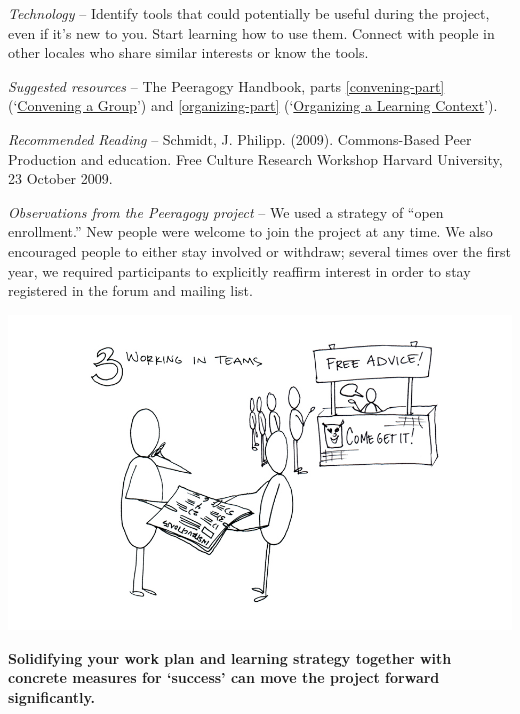 \medskip

\emph{Technology} -- Identify tools that could potentially be useful
during the project, even if it's new to you. Start learning how to use
them. Connect with people in other locales who share similar interests
or know the tools.

\medskip

\emph{Suggested resources} -- The Peeragogy Handbook, parts \ref{convening-part}
(`\href{http://peeragogy.org/convening-a-group/}{Convening a Group}')
and \ref{organizing-part}
(`\href{http://peeragogy.org/organizing-a-learning-context/}{Organizing
a Learning Context}').

\medskip

\emph{Recommended Reading} -- Schmidt, J. Philipp. (2009). Commons-Based
Peer Production and education. Free Culture Research Workshop Harvard
University, 23 October 2009.

\medskip

\emph{Observations from the Peeragogy project} -- We used a strategy of
``open enrollment.'' New people were welcome to join the project at any
time. We also encouraged people to either stay involved or withdraw;
several times over the first year, we required participants to explicitly
reaffirm interest in order to stay registered in the forum and mailing
list.

\begin{center}
\includegraphics{../pictures/OpenBook-2-3.jpg}
\end{center}

\textbf{Solidifying your work plan and learning strategy together with
concrete measures for `success' can move the project forward
significantly.}

\medskip

